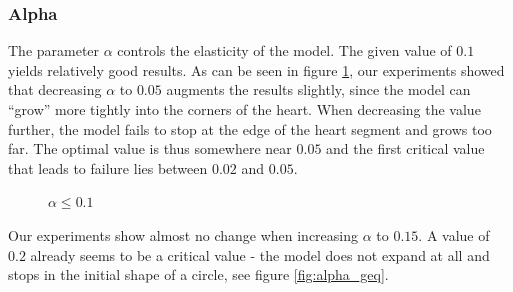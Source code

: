 \subsubsection{Alpha}

The parameter $\alpha$ controls the elasticity of the model. The given value of $0.1$ yields relatively good results. As can be seen in figure \ref{fig:alpha_leq},  our experiments showed that decreasing $\alpha$ to $0.05$ augments the results slightly, since the model can ``grow'' more tightly into the corners of the heart. When decreasing the value further, the model fails to stop at the edge of the heart segment and grows too far. The optimal value is thus somewhere near $0.05$ and the first critical value that leads to failure lies between $0.02$ and $0.05$.
\begin{figure}[!hbt]
\centering   
{}
\caption{$\alpha \leq 0.1$}
\label{fig:alpha_leq}
\end{figure}

Our experiments show almost no change when increasing $\alpha$ to $0.15$. A value of $0.2$ already seems to be a critical value - the model does not expand at all and stops in the initial shape of a circle, see figure \ref{fig:alpha_geq}.

